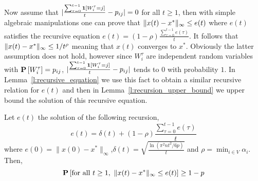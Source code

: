 Now assume that $|\frac{\sum_{\tau=0}^{t-1} \bm{1}{\left[W_i^{\tau}=j\right]}}{t}- p_{ij}| = 0$
for all $t\geq 1$, then with simple algebraic manipulations
one can prove that $\| x(t)-x^* \|_{\infty} \leq e(t)$ where $e(t)$
satisfies the recursive equation $e(t) = (1-\rho)\frac{\sum_{\tau=0}^{t-1}e(\tau)}{t}$.
It follows that $\| x(t)-x^* \|_{\infty} \leq 1/t^\rho$
meaning that $x(t)$ converges to $x^*$.
Obviously the latter assumption does not hold,
however since $W_i^{\tau}$ are independent random variables
with $\bm{\mathrm{P}}\left[W_i^\tau\right]=p_{ij}$,
$|\frac{\sum_{\tau=0}^{t-1} \bm{1}{\left[W_i^{\tau}=j\right]}}{t} - p_{ij}|$
tends to $0$ with probability $1$.
In Lemma~\ref{l:recursive_equation} we use this fact
to obtain a similar recursive relation for $e(t)$
and then in Lemma~\ref{l:recursion_upper_bound}
we upper bound the solution of this recursive equation.
\begin{lemma}\label{l:recursive_equation}
Let $e(t)$ the solution of the following recursion,
\[e(t) =\delta(t) + (1-\rho)\frac{\sum_{\tau=0}^{t-1}e(\tau)}{t}\]
where $e(0)=\|x(0) - x^*\|_{\infty}$,\(\delta(t) = \sqrt{\frac{\ln(\pi^2n t^2/6p)}{t}}\)
and $\rho = \min_{i \in V}\alpha_i$. Then,
\[\bm{\mathrm{P}}\left[\text{for all }t \geq 1, ~\| x(t)-x^* \|_{\infty}\leq e(t)\right] \geq 1-p\]
\end{lemma}
